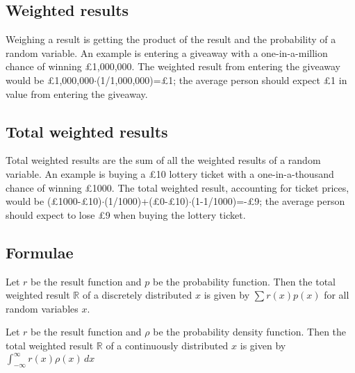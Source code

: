 \documentclass{article}
\begin{document}
		\subsection{Weighted results}
			Weighing a result is getting the product of the result and the probability of a random variable.
			An example is entering a giveaway with a one-in-a-million chance of winning £1,000,000.
			The weighted result from entering the giveaway would be £1,000,000$\cdot$(1/1,000,000)=£1; the average person should expect £1 in value from entering the giveaway.
	
		\subsection{Total weighted results}
			Total weighted results are the sum of all the weighted results of a random variable.
			An example is buying a £10 lottery ticket with a one-in-a-thousand chance of winning £1000.
			The total weighted result, accounting for ticket prices, would be (£1000-£10)$\cdot$(1/1000)+(£0-£10)$\cdot$(1-1/1000)=-£9; the average person should expect to lose £9 when buying the lottery ticket.
	
		\subsection{Formulae}
			Let $r$ be the result function and $p$ be the probability function. Then the total weighted result $\mathbb{R}$ of a discretely distributed $x$ is given by $\sum r(x)p(x)$ for all random variables $x$.
		
			Let $r$ be the result function and $\rho$ be the probability density function. Then the total weighted result $\mathbb{R}$ of a continuously distributed $x$ is given by $\int_{-\infty}^{\infty} r(x)\rho(x)\,dx$
			
\end{document}
